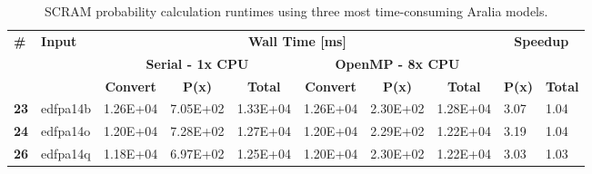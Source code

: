 \begin{longtable}{@{}llllllllll@{}}
\caption{SCRAM probability calculation runtimes using three most time-consuming Aralia models.}
\label{tab:scram_prob_runtimes_aralia}\\
\toprule
\multirow{3}{*}{\textbf{\#}} &
  \multirow{3}{*}{\textbf{Input}} &
  \multicolumn{6}{c}{\textbf{Wall Time {[}ms{]}}} &
  \multicolumn{2}{c}{\multirow{2}{*}{\textbf{Speedup}}} \\* \cmidrule(lr){3-8}
 &
   &
  \multicolumn{3}{c|}{\textbf{Serial - 1x CPU}} &
  \multicolumn{3}{c}{\textbf{OpenMP - 8x CPU}} &
  \multicolumn{2}{c}{} \\* \cmidrule(l){3-10} 
 &
   &
  \multicolumn{1}{c}{\textbf{Convert}} &
  \multicolumn{1}{c}{\textbf{P(x)}} &
  \multicolumn{1}{c|}{\textbf{Total}} &
  \multicolumn{1}{c}{\textbf{Convert}} &
  \multicolumn{1}{c}{\textbf{P(x)}} &
  \multicolumn{1}{c}{\textbf{Total}} &
  \multicolumn{1}{c}{\textbf{P(x)}} &
  \multicolumn{1}{c}{\textbf{Total}} \\* \midrule
\endfirsthead
%
\endhead
%
  \textbf{23} &
  edfpa14b &
  1.26E+04 &
  7.05E+02 &
  \multicolumn{1}{l|}{1.33E+04} &
  1.26E+04 &
  2.30E+02 &
  1.28E+04 &
  3.07 &
  1.04 \\
  \textbf{24} &
  edfpa14o &
  1.20E+04 &
  7.28E+02 &
  \multicolumn{1}{l|}{1.27E+04} &
  1.20E+04 &
  2.29E+02 &
  1.22E+04 &
  3.19 &
  1.04 \\
  \textbf{26} &
  edfpa14q &
  1.18E+04 &
  6.97E+02 &
  \multicolumn{1}{l|}{1.25E+04} &
  1.20E+04 &
  2.30E+02 &
  1.22E+04 &
  3.03 &
  1.03 \\* \bottomrule
\end{longtable}